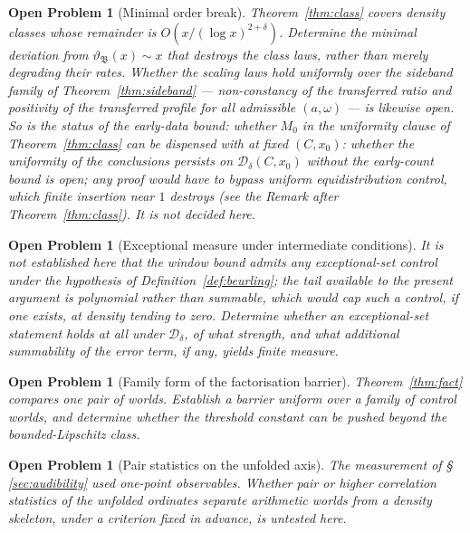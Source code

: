 \documentclass[11pt]{article}
\newtheorem{openproblem}[theorem]{Open Problem}
\newcommand{\Dclass}{\mathcal{D}_\delta}        %
\begin{document}
\begin{openproblem}[Minimal order break]
\label{op:order}
Theorem~\ref{thm:class} covers density classes whose remainder is
$O(x/(\log x)^{2+\delta})$. Determine the minimal deviation from
$\vartheta_{\mathfrak{B}}(x)\sim x$ that destroys the class laws, rather than merely
degrading their rates. Whether the scaling laws hold uniformly over the
sideband family of Theorem~\ref{thm:sideband} --- non-constancy of the
transferred ratio and positivity of the transferred profile for all
admissible $(a,\omega)$ --- is likewise open. So is the status of the
early-data bound: whether $M_0$ in the uniformity clause of
Theorem~\ref{thm:class} can be dispensed with at fixed $(C,x_0)$: whether
the uniformity of the conclusions persists on $\Dclass(C,x_0)$ without the
early-count bound is open; any proof would have to bypass uniform
equidistribution control, which finite insertion near $1$ destroys (see
the Remark after Theorem~\ref{thm:class}). It is not
decided here.
\end{openproblem}

\begin{openproblem}[Exceptional measure under intermediate conditions]
\label{op:exceptional}
It is not established here that the window bound admits any exceptional-set
control under the hypothesis of Definition~\ref{def:beurling}; the tail
available to the present argument is polynomial rather than summable, which
would cap such a control, if one exists, at density tending to zero. Determine
whether an exceptional-set statement holds at all under $\Dclass$, of what
strength, and what additional summability of the error term, if any, yields
finite measure.
\end{openproblem}

\begin{openproblem}[Family form of the factorisation barrier]
\label{op:family}
Theorem~\ref{thm:fact} compares one pair of worlds. Establish a barrier
uniform over a family of control worlds, and determine whether the threshold
constant can be pushed beyond the bounded-Lipschitz class.
\end{openproblem}

\begin{openproblem}[Pair statistics on the unfolded axis]
\label{op:pair}
The measurement of \S\,\ref{sec:audibility} used one-point observables.
Whether pair or higher correlation statistics of the unfolded ordinates
separate arithmetic worlds from a density skeleton, under a criterion fixed in
advance, is untested here.
\end{openproblem}
\end{document}
